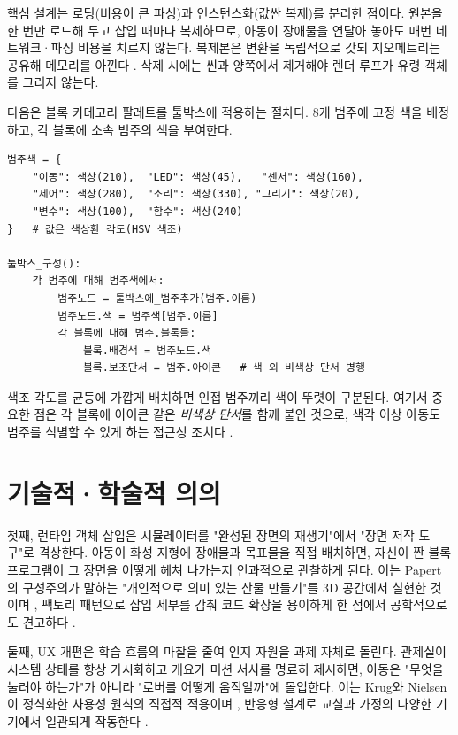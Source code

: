 핵심 설계는 로딩(비용이 큰 파싱)과 인스턴스화(값싼 복제)를 분리한 점이다. 원본을 한 번만 로드해 두고 삽입 때마다 복제하므로, 아동이 장애물을 연달아 놓아도 매번 네트워크·파싱 비용을 치르지 않는다. 복제본은 변환을 독립적으로 갖되 지오메트리는 공유해 메모리를 아낀다 \cite{threejs, gof1994}. 삭제 시에는 씬과  양쪽에서 제거해야 렌더 루프가 유령 객체를 그리지 않는다.

다음은 블록 카테고리 팔레트를 툴박스에 적용하는 절차다. 8개 범주에 고정 색을 배정하고, 각 블록에 소속 범주의 색을 부여한다.

\begin{verbatim}
범주색 = {
    "이동": 색상(210),  "LED": 색상(45),   "센서": 색상(160),
    "제어": 색상(280),  "소리": 색상(330), "그리기": 색상(20),
    "변수": 색상(100),  "함수": 색상(240)
}   # 값은 색상환 각도(HSV 색조)

툴박스_구성():
    각 범주에 대해 범주색에서:
        범주노드 = 툴박스에_범주추가(범주.이름)
        범주노드.색 = 범주색[범주.이름]
        각 블록에 대해 범주.블록들:
            블록.배경색 = 범주노드.색
            블록.보조단서 = 범주.아이콘   # 색 외 비색상 단서 병행
\end{verbatim}

색조 각도를 균등에 가깝게 배치하면 인접 범주끼리 색이 뚜렷이 구분된다. 여기서 중요한 점은 각 블록에 아이콘 같은 \emph{비색상 단서}를 함께 붙인 것으로, 색각 이상 아동도 범주를 식별할 수 있게 하는 접근성 조치다 \cite{wcag21}.

\section{기술적·학술적 의의}

첫째, 런타임 객체 삽입은 시뮬레이터를 "완성된 장면의 재생기"에서 "장면 저작 도구"로 격상한다. 아동이 화성 지형에 장애물과 목표물을 직접 배치하면, 자신이 짠 블록 프로그램이 그 장면을 어떻게 헤쳐 나가는지 인과적으로 관찰하게 된다. 이는 Papert의 구성주의가 말하는 "개인적으로 의미 있는 산물 만들기"를 3D 공간에서 실현한 것이며 \cite{papert1980}, 팩토리 패턴으로 삽입 세부를 감춰 코드 확장을 용이하게 한 점에서 공학적으로도 견고하다 \cite{gof1994, martin2008cleancode}.

둘째, UX 개편은 학습 흐름의 마찰을 줄여 인지 자원을 과제 자체로 돌린다. 관제실이 시스템 상태를 항상 가시화하고 개요가 미션 서사를 명료히 제시하면, 아동은 "무엇을 눌러야 하는가"가 아니라 "로버를 어떻게 움직일까"에 몰입한다. 이는 Krug와 Nielsen이 정식화한 사용성 원칙의 직접적 적용이며 \cite{krug2014dontmakemethink, nielsen1994heuristics}, 반응형 설계로 교실과 가정의 다양한 기기에서 일관되게 작동한다 \cite{marcotte2010responsive}.

